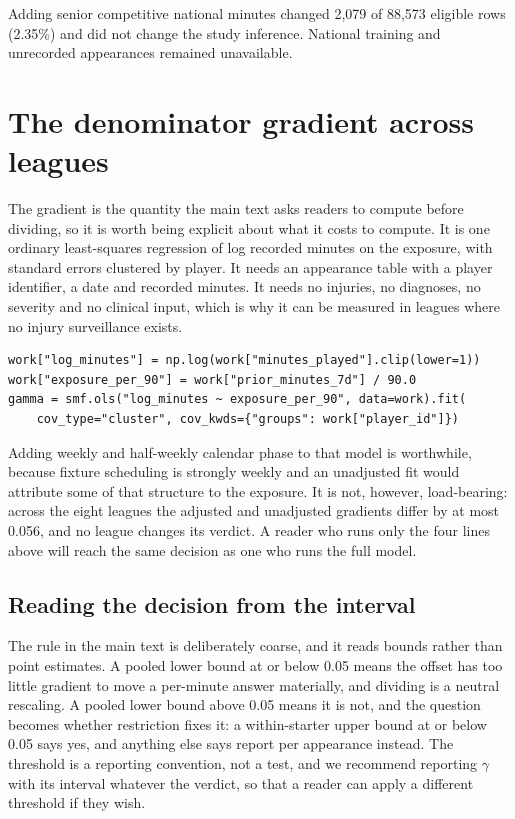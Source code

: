 \documentclass[11pt]{article}
\begin{document}
Adding senior competitive national minutes changed 2,079 of 88,573 eligible rows (2.35\%) and did not change the study inference. National training and unrecorded appearances remained unavailable.


\section{The denominator gradient across leagues}

The gradient is the quantity the main text asks readers to compute before dividing, so it is worth being explicit about what it costs to compute. It is one ordinary least-squares regression of log recorded minutes on the exposure, with standard errors clustered by player. It needs an appearance table with a player identifier, a date and recorded minutes. It needs no injuries, no diagnoses, no severity and no clinical input, which is why it can be measured in leagues where no injury surveillance exists.

\begin{verbatim}
work["log_minutes"] = np.log(work["minutes_played"].clip(lower=1))
work["exposure_per_90"] = work["prior_minutes_7d"] / 90.0
gamma = smf.ols("log_minutes ~ exposure_per_90", data=work).fit(
    cov_type="cluster", cov_kwds={"groups": work["player_id"]})
\end{verbatim}

Adding weekly and half-weekly calendar phase to that model is worthwhile, because fixture scheduling is strongly weekly and an unadjusted fit would attribute some of that structure to the exposure. It is not, however, load-bearing: across the eight leagues the adjusted and unadjusted gradients differ by at most 0.056, and no league changes its verdict. A reader who runs only the four lines above will reach the same decision as one who runs the full model.

\subsection*{Reading the decision from the interval}

The rule in the main text is deliberately coarse, and it reads bounds rather than point estimates. A pooled lower bound at or below 0.05 means the offset has too little gradient to move a per-minute answer materially, and dividing is a neutral rescaling. A pooled lower bound above 0.05 means it is not, and the question becomes whether restriction fixes it: a within-starter upper bound at or below 0.05 says yes, and anything else says report per appearance instead. The threshold is a reporting convention, not a test, and we recommend reporting $\gamma$ with its interval whatever the verdict, so that a reader can apply a different threshold if they wish.
\end{document}
